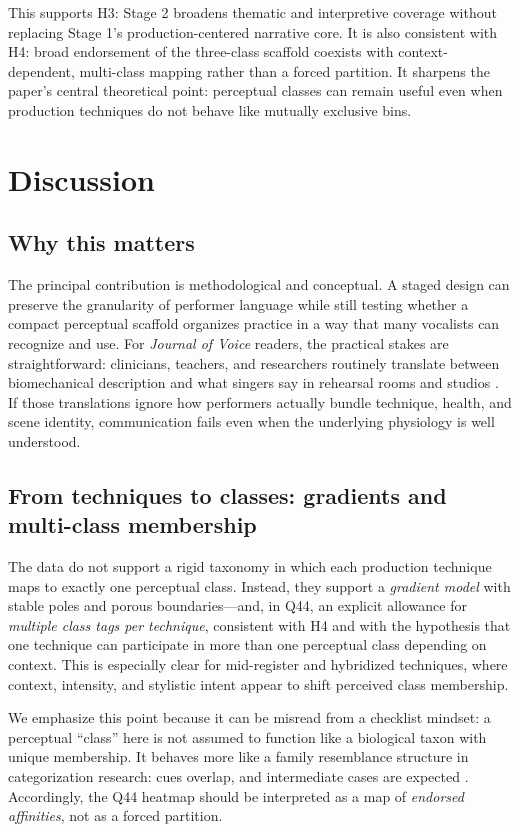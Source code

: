 \documentclass{article}
\begin{document}
This supports H3: Stage 2 broadens thematic and interpretive coverage without replacing Stage 1's production-centered narrative core.
It is also consistent with H4: broad endorsement of the three-class scaffold coexists with context-dependent, multi-class mapping rather than a forced partition.
It sharpens the paper's central theoretical point: perceptual classes can remain useful even when production techniques do not behave like mutually exclusive bins.

\section{Discussion}
\subsection*{Why this matters}
The principal contribution is methodological and conceptual.
A staged design can preserve the granularity of performer language while still testing whether a compact perceptual scaffold organizes practice in a way that many vocalists can recognize and use.
For \emph{Journal of Voice} readers, the practical stakes are straightforward: clinicians, teachers, and researchers routinely translate between biomechanical description and what singers say in rehearsal rooms and studios \parencite{sadolin2000complete,sadolin2012effects}.
If those translations ignore how performers actually bundle technique, health, and scene identity, communication fails even when the underlying physiology is well understood.

\subsection*{From techniques to classes: gradients and multi-class membership}
The data do not support a rigid taxonomy in which each production technique maps to exactly one perceptual class.
Instead, they support a \emph{gradient model} with stable poles and porous boundaries---and, in Q44, an explicit allowance for \emph{multiple class tags per technique}, consistent with H4 and with the hypothesis that one technique can participate in more than one perceptual class depending on context.
This is especially clear for mid-register and hybridized techniques, where context, intensity, and stylistic intent appear to shift perceived class membership.

We emphasize this point because it can be misread from a checklist mindset: a perceptual ``class'' here is not assumed to function like a biological taxon with unique membership.
It behaves more like a family resemblance structure in categorization research: cues overlap, and intermediate cases are expected \parencite{Navarro2010,Pinto2023VocalEffects,Anikin2025AcousticRoughness}.
Accordingly, the Q44 heatmap should be interpreted as a map of \emph{endorsed affinities}, not as a forced partition.
\end{document}
